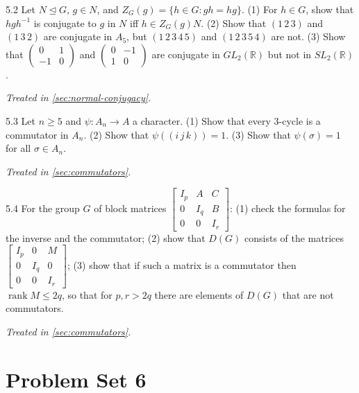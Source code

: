 \documentclass[11pt]{report}
\begin{document}
\begin{hwbox}{5.2}\label{hw:5.2}
Let $N \trianglelefteq G$, $g \in N$, and $Z_G(g) = \{h \in G : gh = hg\}$. (1) For $h \in G$, show that $hgh^{-1}$ is conjugate to $g$ in $N$ iff $h \in Z_G(g)N$. (2) Show that $(1\,2\,3)$ and $(1\,3\,2)$ are conjugate in $A_5$, but $(1\,2\,3\,4\,5)$ and $(1\,2\,3\,5\,4)$ are not. (3) Show that $\begin{pmatrix} 0 & 1 \\ -1 & 0 \end{pmatrix}$ and $\begin{pmatrix} 0 & -1 \\ 1 & 0 \end{pmatrix}$ are conjugate in $GL_2(\mathbb{R})$ but not in $SL_2(\mathbb{R})$.
\end{hwbox}
\textit{Treated in \ref{sec:normal-conjugacy}.}

\begin{hwbox}{5.3}\label{hw:5.3}
Let $n \geq 5$ and $\psi: A_n \to A$ a character. (1) Show that every $3$-cycle is a commutator in $A_n$. (2) Show that $\psi((i\,j\,k)) = 1$. (3) Show that $\psi(\sigma) = 1$ for all $\sigma \in A_n$.
\end{hwbox}
\textit{Treated in \ref{sec:commutators}.}

\begin{hwbox}{5.4}\label{hw:5.4}
For the group $G$ of block matrices $\begin{bmatrix} I_p & A & C \\ 0 & I_q & B \\ 0 & 0 & I_r \end{bmatrix}$: (1) check the formulas for the inverse and the commutator; (2) show that $D(G)$ consists of the matrices $\begin{bmatrix} I_p & 0 & M \\ 0 & I_q & 0 \\ 0 & 0 & I_r \end{bmatrix}$; (3) show that if such a matrix is a commutator then $\operatorname{rank} M \leq 2q$, so that for $p, r > 2q$ there are elements of $D(G)$ that are not commutators.
\end{hwbox}
\textit{Treated in \ref{sec:commutators}.}

\section*{Problem Set 6}
{}
\end{document}
